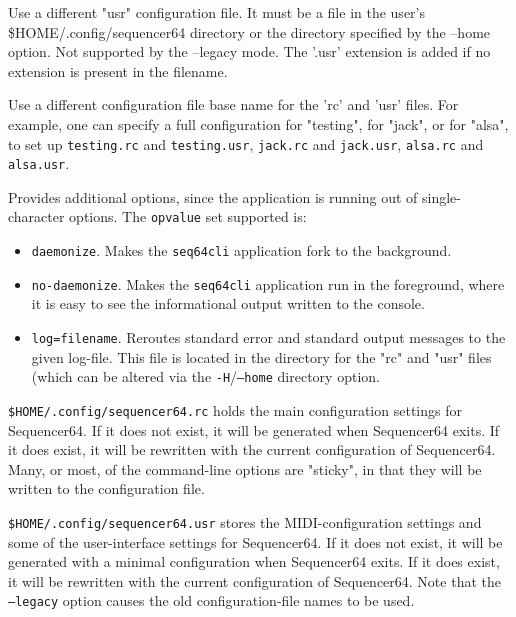       Use a different "usr" configuration file.  It must be a file in the
      user's \$HOME/.config/sequencer64 directory or the directory specified by
      the --home option.  Not supported by the --legacy mode.  The '.usr'
      extension is added if no extension is present in the filename.

      Use a different configuration file base name for the 'rc' and 'usr'
      files.  For example, one can specify a full configuration for "testing",
      for "jack", or for "alsa", to set up
      \texttt{testing.rc} and \texttt{testing.usr},
      \texttt{jack.rc} and \texttt{jack.usr},
      \texttt{alsa.rc} and \texttt{alsa.usr}.

      Provides additional options, since the application is running out of
      single-character options.  The \texttt{opvalue} set supported is:
      \begin{itemize}
         \item \texttt{daemonize}.  Makes the \texttt{seq64cli} application
            fork to the background.
         \item \texttt{no-daemonize}.  Makes the \texttt{seq64cli} application
            run in the foreground, where it is easy to see the informational
            output written to the console.
         \item \texttt{log=filename}.  Reroutes standard error and standard
            output messages to the given log-file.  This file is located in the
            directory for the "rc" and "usr" files (which can be altered via
            the \texttt{-H}/\texttt{--home} directory option.
      \end{itemize}

   \texttt{\$HOME/.config/sequencer64.rc} holds the main configuration settings
   for Sequencer64.  If it does not exist, it will be generated when
   Sequencer64 exits.  If it does exist, it will be rewritten with the
   current configuration of Sequencer64.  Many, or most, of the command-line
   options are "sticky", in that they will be written to the configuration
   file.

   \texttt{\$HOME/.config/sequencer64.usr} stores the MIDI-configuration
   settings and some of the user-interface settings for Sequencer64.  If it
   does not exist, it will be generated with a minimal configuration when
   Sequencer64 exits.  If it does exist, it will be rewritten with the current
   configuration of Sequencer64.  Note that the
   \texttt{--legacy} option causes the old
   configuration-file names to be used.

